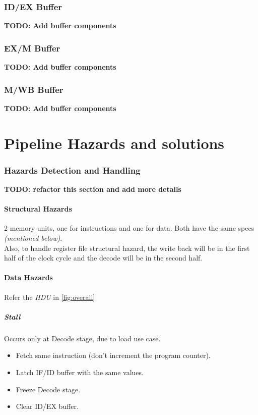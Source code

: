 \documentclass[12pt]{report}
\begin{document}
\section{ID/EX Buffer}
\textbf{TODO: Add buffer components}

\section{EX/M Buffer}
\textbf{TODO: Add buffer components}

\section{M/WB Buffer}
\textbf{TODO: Add buffer components}

\part{Pipeline Hazards and solutions}

\section{Hazards Detection and Handling}
\textbf{TODO: refactor this section and add more details}

\subsection{Structural Hazards}
2 memory units, one for instructions and one for data. Both have the same specs \emph{(mentioned below)}. \\
Also, to handle register file structural hazard, the write back will be in the first half of the clock cycle and the decode will be in the second half.

\subsection{Data Hazards}
Refer the \emph{HDU} in \ref{fig:overall}

\subsubsection{Stall}
Occurs only at Decode stage, due to load use case.
\begin{itemize}
    \item Fetch same instruction (don't increment the program counter).
    \item Latch IF/ID buffer with the same values.
    \item Freeze Decode stage.
    \item Clear ID/EX buffer.
\end{itemize}
\end{document}
